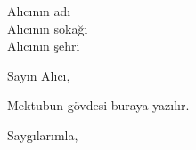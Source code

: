 \documentclass{letter}
\begin{document}
\begin{letter}{Alıcının adı \\ Alıcının sokağı \\ Alıcının şehri}
\opening{Sayın Alıcı,}

Mektubun gövdesi buraya yazılır.

\closing{Saygılarımla,}

\end{letter}
\end{document}
